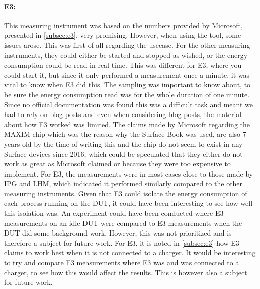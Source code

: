 \paragraph*{E3:} This measuring instrument was based on the numbers provided by Microsoft, presented in \cref{subsec:e3}, very promising. However, when using the tool, some issues arose. This was first of all regarding the usecase. For the other measuring instruments, they could either be started and stopped as wished, or the energy consumption could be read in real-time. This was different for E3, where you could start it, but since it only performed a measurement once a minute, it was vital to know when E3 did this. The sampling was important to know about, to be sure the energy consumption read was for the whole duration of one minute. Since no official documentation was found this was a difficult task and meant we had to rely on blog posts and even when considering blog posts, the material about how E3 worked was limited.
The claims made by Microsoft regarding the MAXIM chip which was the reason why the Surface Book was used, are also 7 years old by the time of writing this and the chip do not seem to exist in any Surface devices since 2016, which could be speculated that they either do not work as great as Microsoft claimed or because they were too expensive to implement. For E3, the measurements were in most cases close to those made by IPG and LHM, which indicated it performed similarly compared to the other measuring instruments. Given that E3 could isolate the energy consumption of each process running on the DUT, it could have been interesting to see how well this isolation was. An experiment could have been conducted where E3 measurements on an idle DUT were compared to E3 measurements when the DUT did some background work. However, this was not prioritized and is therefore a subject for future work. For E3, it is noted in \cref{subsec:e3} how E3 claims to work best when it is not connected to a charger. It would be interesting to try and compare E3 measurements where E3 was and was connected to a charger, to see how this would affect the results. This is however also a subject for future work.



